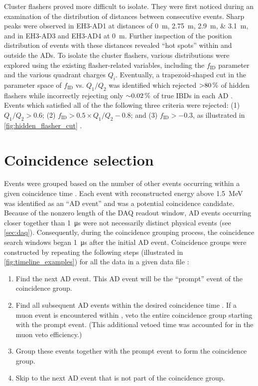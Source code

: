 Cluster flashers proved more difficult to isolate.
They were first noticed during an examination of the distribution of distances
between consecutive events.
Sharp peaks were observed in EH3-AD1 at distances of \SIlist{0;2.75;2.9;3.1}{\m},
and in EH3-AD3 and EH3-AD4 at \SI{0}{\m}.
Further inspection of the position distribution of events with these distances
revealed ``hot spots'' within and outside the ADs.
To isolate the cluster flashers,
various distributions were explored using the existing flasher-related variables,
including the $f_{\text{ID}}$ parameter and the various quadrant charges $Q_i$.
Eventually, a trapezoid-shaped cut in the parameter space of
$f_{\text{ID}}$ vs. $Q_1/Q_2$ was identified which rejected
$\SI{>80}{\percent}$ of hidden flashers while incorrectly rejecting only
$\SI{\sim0.02}{\percent}$ of true IBDs in each AD \cite{nh2021technote}.
Events which satisfied all of the the following three criteria were rejected:
(1) $Q_1/Q_2 > 0.6$; (2) $f_{\text{ID}} > 0.5 \times Q_1/Q_2 - 0.8$;
and (3) $f_{\text{ID}} > -0.3$,
as illustrated in \cref{fig:hidden_flasher_cut}
\cite{beda_resid_flasher_dt,flashers_jinjing}.

\section{Coincidence selection}
\label{sec:coincidence}

Events were grouped based on the number of other events
occurring within a given coincidence time \tc.
Each event with reconstructed energy above \SI{1.5}{\mega\electronvolt}
was identified as an ``AD event''
and was a potential coincidence candidate.
Because of the nonzero length of the DAQ readout window,
AD events occurring closer together than \SI{1}{\micro\second}
were not necessarily distinct physical events (see \cref{sec:daq}).
Consequently, during the coincidence grouping process,
the coincidence search windows began \SI{1}{\micro\second}
after the initial AD event.
Coincidence groups were constructed by repeating the following steps
(illustrated in \cref{fig:timeline_examples})
for all the data in a given data file \cite{thucoinc2015}:

\begin{enumerate}
    \item Find the next AD event.
        This AD event will be the ``prompt'' event of the coincidence group.
    \item Find all subsequent AD events within the desired coincidence time \tc.
        If a muon event is encountered within \tc,
        veto the entire coincidence group starting with the prompt event.
        (This additional vetoed time was accounted for in the muon veto efficiency.)
    \item Group these events together with the prompt event
        to form the coincidence group.
    \item Skip to the next AD event that is not part of the coincidence group.
\end{enumerate}

